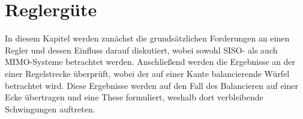 \chapter{Reglergüte}
In diesem Kapitel werden zunächst die grundsätzlichen Forderungen an einen Regler und dessen Einfluss darauf diskutiert, wobei sowohl SISO- als auch MIMO-Systeme betrachtet werden. Anschließend werden die Ergebnisse an der einer Regelstrecke überprüft, wobei der auf einer Kante balancierende Würfel betrachtet wird. Diese Ergebnisse werden auf den Fall des Balancieren auf einer Ecke übertragen und eine These formuliert, weshalb dort verbleibende Schwingungen auftreten.

\newpage
